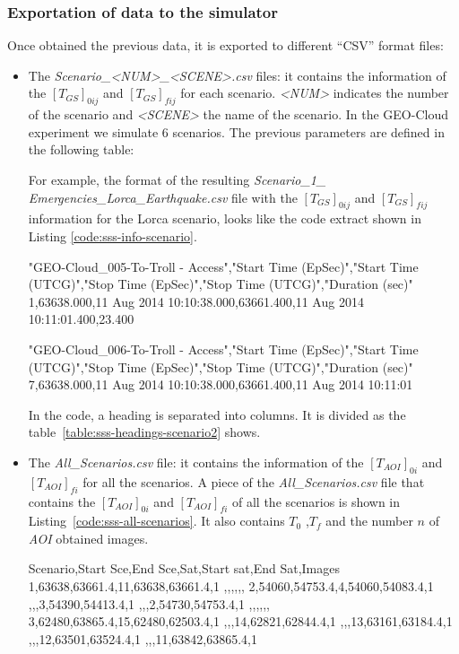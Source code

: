 \subsubsection{Exportation of data to the simulator}

Once obtained the previous data, it is exported to different ``CSV'' format files: 

\begin{itemize}
\item 	The \emph{Scenario\_<NUM>\_<SCENE>.csv} files: it contains the information
  of the $[T_{GS}]_{0ij}$ and $[T_{GS}]_{fij}$ for each scenario. \emph{<NUM>} indicates
  the number of the scenario and \emph{<SCENE>} the name of the scenario. In the
  GEO-Cloud experiment we simulate 6 scenarios. The previous parameters are
  defined in the following table:


For example, the format of the resulting \emph{Scenario\_1\_
Emergencies\_Lorca\_Earthquake.csv} file with the $[T_{GS}]_{0ij}$ and $[T_{GS}]_{fij}$
information for the Lorca scenario, looks like the code extract shown in Listing
\ref{code:sss-info-scenario}.
\begin{listing}[
  float=h!,
  caption  = {Extract of the \emph{Scenario\_1\_Emergencies\_Lorca\_Earthquake.csv}
    of the Lorca scenario},
  label    = code:sss-info-scenario,
style=customc]
"GEO-Cloud_005-To-Troll - Access","Start Time (EpSec)","Start Time (UTCG)","Stop Time (EpSec)","Stop Time (UTCG)","Duration (sec)"
1,63638.000,11 Aug 2014 10:10:38.000,63661.400,11 Aug 2014 10:11:01.400,23.400

"GEO-Cloud_006-To-Troll - Access","Start Time (EpSec)","Start Time (UTCG)","Stop Time (EpSec)","Stop Time (UTCG)","Duration (sec)"
7,63638.000,11 Aug 2014 10:10:38.000,63661.400,11 Aug 2014 10:11:01

\end{listing}
In the code, a heading is separated into columns. It is divided as the
table~\ref{table:sss-headings-scenario2} shows.

\item 	The \emph{All\_Scenarios.csv} file: it contains the information of the $[T_{AOI}]_{0i}$ and $[T_{AOI}]_{fi}$ for all the scenarios.
A piece of the \emph{All\_Scenarios.csv} file that contains the $[T_{AOI}]_{0i}$
and $[T_{AOI}]_{fi}$ of all the scenarios is shown in Listing~\ref{code:sss-all-scenarios}.  It also contains  $T_0$ ,$T_f$ and the number $n$ of \emph{AOI} obtained images.


\begin{listing}[
  float=h!,
  caption  = {Extract of the \emph{All\_Scenarios.csv} code of the Lorca scenario},
  label    = code:sss-all-scenarios,
style=customc]
Scenario,Start Sce,End Sce,Sat,Start sat,End Sat,Images
1,63638,63661.4,11,63638,63661.4,1
,,,,,,
2,54060,54753.4,4,54060,54083.4,1
,,,3,54390,54413.4,1
,,,2,54730,54753.4,1
,,,,,,
3,62480,63865.4,15,62480,62503.4,1
,,,14,62821,62844.4,1
,,,13,63161,63184.4,1
,,,12,63501,63524.4,1
,,,11,63842,63865.4,1
\end{listing}


\end{itemize}
